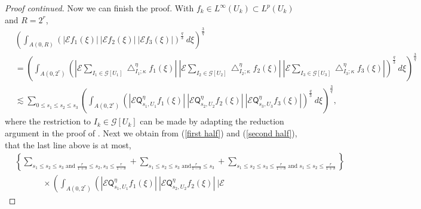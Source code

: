 \documentclass{amsart}%
\theoremstyle{plain}
\numberwithin{equation}{section}
\begin{document}
\begin{proof}
[Proof continued]Now we can finish the proof. With $f_{k}\in L^{\infty}\left(
U_{k}\right)  \subset L^{p}\left(  U_{k}\right)  $ and $R=2^{r}$,
\begin{align*}
&  \left(  \int_{A\left(  0,R\right)  }\left(  \left\vert \mathcal{E}%
f_{1}\left(  \xi\right)  \right\vert \ \left\vert \mathcal{E}f_{2}\left(
\xi\right)  \right\vert \ \left\vert \mathcal{E}f_{3}\left(  \xi\right)
\right\vert \right)  ^{\frac{q}{3}}\ d\xi\right)  ^{\frac{3}{q}}\\
&  =\left(  \int_{A\left(  0,2^{r}\right)  }\left(  \left\vert \mathcal{E}%
\sum_{I_{1}\in\mathcal{G}\left[  U_{1}\right]  }\bigtriangleup_{I_{1};\kappa
}^{\eta}f_{1}\left(  \xi\right)  \right\vert \ \left\vert \mathcal{E}%
\sum_{I_{2}\in\mathcal{G}\left[  U_{2}\right]  }\bigtriangleup_{I_{2};\kappa
}^{\eta}f_{2}\left(  \xi\right)  \right\vert \ \left\vert \mathcal{E}%
\sum_{I_{3}\in\mathcal{G}\left[  U_{3}\right]  }\bigtriangleup_{I_{3};\kappa
}^{\eta}f_{3}\left(  \xi\right)  \right\vert \right)  ^{\frac{q}{3}}%
\ d\xi\right)  ^{\frac{3}{q}}\\
&  \lesssim\sum_{0\leq s_{1}\leq s_{2}\leq s_{3}}\left(  \int_{A\left(
0,2^{r}\right)  }\left(  \left\vert \mathcal{E}\mathsf{Q}_{s_{1},U_{1}}^{\eta
}f_{1}\left(  \xi\right)  \right\vert \ \left\vert \mathcal{E}\mathsf{Q}%
_{s_{2},U_{2}}^{\eta}f_{2}\left(  \xi\right)  \right\vert \ \left\vert
\mathcal{E}\mathsf{Q}_{s_{3},U_{3}}^{\eta}f_{3}\left(  \xi\right)  \right\vert
\right)  ^{\frac{q}{3}}\ d\xi\right)  ^{\frac{3}{q}},
\end{align*}
where the restriction to $I_{k}\in\mathcal{G}\left[  U_{k}\right]  $ can be
made by adapting the reduction argument in the proof of \cite[Lemma 2 on page
5]{Saw7}. Next we obtain from (\ref{first half}) and (\ref{second half}), that
the last line above is at most,%
\begin{align*}
&  \left\{  \sum_{s_{1}\leq s_{2}\leq s_{3}\text{ and }\frac{r}{1+\delta}\leq
s_{2},s_{3}\leq\frac{r}{1-\delta}}+\sum_{s_{1}\leq s_{2}\leq s_{3}\text{ and
}\frac{r}{1-\delta}\leq s_{3}}+\sum_{s_{1}\leq s_{2}\leq s_{3}\leq\frac
{r}{1-\delta}\text{ and }s_{1}\leq s_{2}\leq\frac{r}{1+\delta}}\right\} \\
&  \ \ \ \ \ \ \ \ \ \ \ \ \ \ \ \times\left(  \int_{A\left(  0,2^{r}\right)
}\left(  \left\vert \mathcal{E}\mathsf{Q}_{s_{1},U_{1}}^{\eta}f_{1}\left(
\xi\right)  \right\vert \ \left\vert \mathcal{E}\mathsf{Q}_{s_{2},U_{2}}%
^{\eta}f_{2}\left(  \xi\right)  \right\vert \ \left\vert \mathcal{E}%

\end{align*}
\end{proof}
\end{document}
